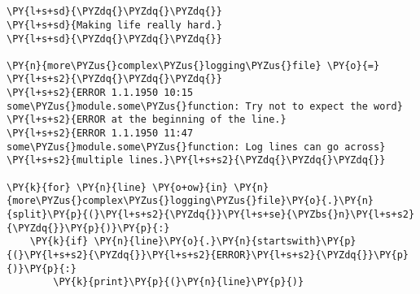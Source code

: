 

\section*{}

\begin{Verbatim}[commandchars=\\\{\}]
\PY{l+s+sd}{\PYZdq{}\PYZdq{}\PYZdq{}}
\PY{l+s+sd}{Making life really hard.}
\PY{l+s+sd}{\PYZdq{}\PYZdq{}\PYZdq{}}

\PY{n}{more\PYZus{}complex\PYZus{}logging\PYZus{}file} \PY{o}{=} \PY{l+s+s2}{\PYZdq{}\PYZdq{}\PYZdq{}}
\PY{l+s+s2}{ERROR 1.1.1950 10:15 some\PYZus{}module.some\PYZus{}function: Try not to expect the word}
\PY{l+s+s2}{ERROR at the beginning of the line.}
\PY{l+s+s2}{ERROR 1.1.1950 11:47 some\PYZus{}module.some\PYZus{}function: Log lines can go across}
\PY{l+s+s2}{multiple lines.}\PY{l+s+s2}{\PYZdq{}\PYZdq{}\PYZdq{}}

\PY{k}{for} \PY{n}{line} \PY{o+ow}{in} \PY{n}{more\PYZus{}complex\PYZus{}logging\PYZus{}file}\PY{o}{.}\PY{n}{split}\PY{p}{(}\PY{l+s+s2}{\PYZdq{}}\PY{l+s+se}{\PYZbs{}n}\PY{l+s+s2}{\PYZdq{}}\PY{p}{)}\PY{p}{:}
    \PY{k}{if} \PY{n}{line}\PY{o}{.}\PY{n}{startswith}\PY{p}{(}\PY{l+s+s2}{\PYZdq{}}\PY{l+s+s2}{ERROR}\PY{l+s+s2}{\PYZdq{}}\PY{p}{)}\PY{p}{:}
        \PY{k}{print}\PY{p}{(}\PY{n}{line}\PY{p}{)}
\end{Verbatim}

